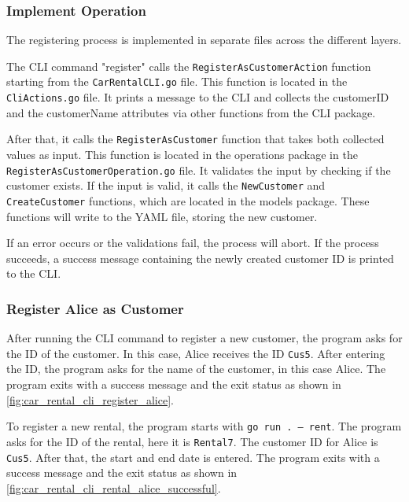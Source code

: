 \subsubsection*{Implement Operation}
The registering process is implemented in separate files across the different layers.

The CLI command "register" calls the \texttt{RegisterAsCustomerAction} function starting from the \texttt{CarRentalCLI.go} file.
This function is located in the \texttt{CliActions.go} file.
It prints a message to the CLI and collects the customerID and the customerName attributes via other functions from the CLI package.

After that, it calls the \texttt{RegisterAsCustomer} function that takes both collected \hfill \linebreak values as input.
This function is located in the operations package in the \hfill \linebreak \texttt{RegisterAsCustomerOperation.go} file.
It validates the input by checking if the customer exists.
If the input is valid, it calls the \texttt{NewCustomer} and \texttt{CreateCustomer} functions, which are located in the models package.
These functions will write to the YAML file, storing the new customer.

If an error occurs or the validations fail, the process will abort.
If the process succeeds, a success message containing the newly created customer ID is printed to the CLI.

\subsubsection*{Register Alice as Customer}
After running the CLI command to register a new customer, the program asks for the ID of the customer.
In this case, Alice receives the ID \texttt{Cus5}.
After entering the ID, the program asks for the name of the customer, in this case Alice.
The program exits with a success message and the exit status as shown in \autoref{fig:car_rental_cli_register_alice}.

To register a new rental, the program starts with \texttt{go run . --- rent}.
The program asks for the ID of the rental, here it is \texttt{Rental7}.
The customer ID for Alice is \texttt{Cus5}.
After that, the start and end date is entered.
The program exits with a success message and the exit status as shown in \autoref{fig:car_rental_cli_rental_alice_successful}.


